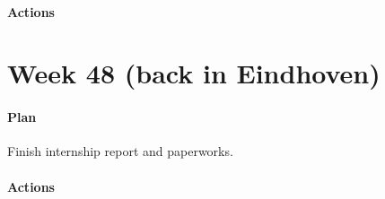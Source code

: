 \paragraph{Actions} 

\section{Week 48 (back in Eindhoven)}

\paragraph{Plan} Finish internship report and paperworks.

\paragraph{Actions} 

